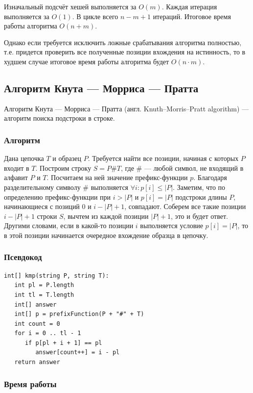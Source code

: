 Изначальный подсчёт хешей выполняется за $O(m)$.
Каждая итерация выполняется за $O(1)$.
В цикле всего $n-m+1$ итераций.
Итоговое время работы алгоритма $O(n+m)$.

Однако если требуется исключить ложные срабатывания алгоритма полностью, т.е. придется проверить все полученные позиции вхождения на истинность, то в худшем случае итоговое время работы алгоритма будет $O(n \cdot m)$.

\subsection{Алгоритм Кнута --- Морриса --- Пратта}

Алгоритм Кнута --- Морриса --- Пратта (англ. Knuth–Morris–Pratt algorithm) --- алгоритм поиска подстроки в строке.

\subsubsection{Алгоритм}

Дана цепочка $T$ и образец $P$.
Требуется найти все позиции, начиная с которых $P$ входит в $T$.
Построим строку $S=P\#T$, где $\#$ --- любой символ, не входящий в алфавит $P$ и $T$.
Посчитаем на ней значение префикс-функции $p$.
Благодаря разделительному символу $\#$ выполняется $\forall i:p[i] \le |P|$.
Заметим, что по определению префикс-функции при $i>|P|$ и $p[i]=|P|$ подстроки длины $P$, начинающиеся с позиций 0 и $i-|P|+1$, совпадают.
Соберем все такие позиции $i-|P|+1$ строки $S$, вычтем из каждой позиции $|P|+1$, это и будет ответ.
Другими словами, если в какой-то позиции $i$ выполняется условие $p[i]=|P|$, то в этой позиции начинается очередное вхождение образца в цепочку.

\subsubsection{Псевдокод}

\begin{verbatim}
int[] kmp(string P, string T):
   int pl = P.length
   int tl = T.length
   int[] answer
   int[] p = prefixFunction(P + "#" + T)
   int count = 0
   for i = 0 .. tl - 1
      if p[pl + i + 1] == pl
         answer[count++] = i - pl
   return answer
\end{verbatim}

\subsubsection{Время работы}

